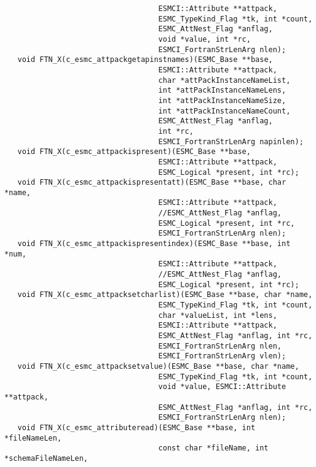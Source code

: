 \begin{verbatim}
                                   ESMCI::Attribute **attpack,
                                   ESMC_TypeKind_Flag *tk, int *count,
                                   ESMC_AttNest_Flag *anflag,
                                   void *value, int *rc,
                                   ESMCI_FortranStrLenArg nlen);
   void FTN_X(c_esmc_attpackgetapinstnames)(ESMC_Base **base,
                                   ESMCI::Attribute **attpack,
                                   char *attPackInstanceNameList,
                                   int *attPackInstanceNameLens,
                                   int *attPackInstanceNameSize,
                                   int *attPackInstanceNameCount,
                                   ESMC_AttNest_Flag *anflag,
                                   int *rc,
                                   ESMCI_FortranStrLenArg napinlen);
   void FTN_X(c_esmc_attpackispresent)(ESMC_Base **base,
                                   ESMCI::Attribute **attpack,
                                   ESMC_Logical *present, int *rc);
   void FTN_X(c_esmc_attpackispresentatt)(ESMC_Base **base, char *name,
                                   ESMCI::Attribute **attpack,
                                   //ESMC_AttNest_Flag *anflag,
                                   ESMC_Logical *present, int *rc,
                                   ESMCI_FortranStrLenArg nlen);
   void FTN_X(c_esmc_attpackispresentindex)(ESMC_Base **base, int *num,
                                   ESMCI::Attribute **attpack,
                                   //ESMC_AttNest_Flag *anflag,
                                   ESMC_Logical *present, int *rc);
   void FTN_X(c_esmc_attpacksetcharlist)(ESMC_Base **base, char *name,
                                   ESMC_TypeKind_Flag *tk, int *count,
                                   char *valueList, int *lens,
                                   ESMCI::Attribute **attpack,
                                   ESMC_AttNest_Flag *anflag, int *rc,
                                   ESMCI_FortranStrLenArg nlen,
                                   ESMCI_FortranStrLenArg vlen);
   void FTN_X(c_esmc_attpacksetvalue)(ESMC_Base **base, char *name,
                                   ESMC_TypeKind_Flag *tk, int *count,
                                   void *value, ESMCI::Attribute **attpack,
                                   ESMC_AttNest_Flag *anflag, int *rc,
                                   ESMCI_FortranStrLenArg nlen);
   void FTN_X(c_esmc_attributeread)(ESMC_Base **base, int *fileNameLen,
                                   const char *fileName, int *schemaFileNameLen,

\end{verbatim}
